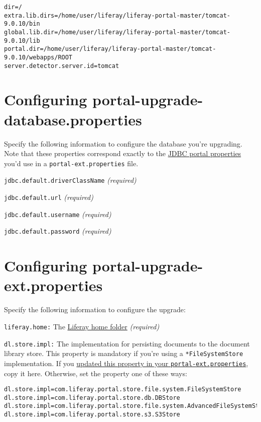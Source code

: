 \begin{verbatim}
dir=/
extra.lib.dirs=/home/user/liferay/liferay-portal-master/tomcat-9.0.10/bin
global.lib.dir=/home/user/liferay/liferay-portal-master/tomcat-9.0.10/lib
portal.dir=/home/user/liferay/liferay-portal-master/tomcat-9.0.10/webapps/ROOT
server.detector.server.id=tomcat
\end{verbatim}

\section{Configuring
portal-upgrade-database.properties}\label{configuring-portal-upgrade-database.properties}

Specify the following information to configure the database you're
upgrading. Note that these properties correspond exactly to the
\href{@platform-ref@/7.2-latest/propertiesdoc/portal.properties.html\#JDBC}{JDBC
portal properties} you'd use in a \texttt{portal-ext.properties} file.

\texttt{jdbc.default.driverClassName} \emph{(required)}

\texttt{jdbc.default.url} \emph{(required)}

\texttt{jdbc.default.username} \emph{(required)}

\texttt{jdbc.default.password} \emph{(required)}

\section{Configuring
portal-upgrade-ext.properties}\label{configuring-portal-upgrade-ext.properties}

Specify the following information to configure the upgrade:

\texttt{liferay.home:} The
\href{/docs/7-2/deploy/-/knowledge_base/d/liferay-home}{Liferay home
folder} \emph{(required)}

\texttt{dl.store.impl:} The implementation for persisting documents to
the document library store. This property is mandatory if you're using a
\texttt{*FileSystemStore} implementation. If you
\href{/docs/7-2/deploy/-/knowledge_base/d/preparing-a-new-product-server-for-data-upgrade}{updated
this property in your \texttt{portal-ext.properties}}, copy it here.
Otherwise, set the property one of these ways:

\begin{verbatim}
dl.store.impl=com.liferay.portal.store.file.system.FileSystemStore
dl.store.impl=com.liferay.portal.store.db.DBStore
dl.store.impl=com.liferay.portal.store.file.system.AdvancedFileSystemStore
dl.store.impl=com.liferay.portal.store.s3.S3Store
\end{verbatim}

